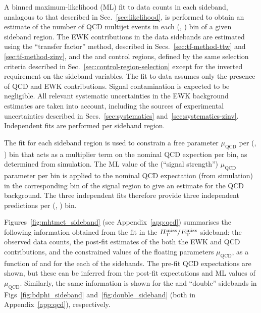 A binned maximum-likelihood (ML) fit to data counts in each sideband,
analagous to that described in Sec.~\ref{sec:likelihood}, is performed
to obtain an estimate of the number of QCD multijet events in each
(\njet, \scalht) bin of a given sideband region. The EWK contributions
in the data sidebands are estimated using the ``transfer factor''
method, described in Secs.~\ref{sec:tf-method-ttw} and
\ref{sec:tf-method-zinv}, and the \mj and \mmj control regions,
defined by the same selection criteria described in
Sec.~\ref{sec:control-region-selection} except for the inverted
requirement on the sideband variables. The fit to data assumes only
the presence of QCD and EWK contributions. Signal contamination is
expected to be negligible. All relevant systematic uncertainties in
the EWK background estimates are taken into account, including the
sources of experimental uncertainties described in
Secs.~\ref{sec:systematics}
and~\ref{sec:systematics-zinv}. Independent fits are performed per
sideband region.

The fit for each sideband region is used to constrain a free parameter
$\mu_{\textrm{QCD}}$ per (\njet, \scalht) bin that acts as a
multiplier term on the nominal QCD expection per bin, as determined
from simulation. The ML value of the (``signal strength'')
$\mu_{\textrm{QCD}}$ parameter per bin is applied to the nominal QCD
expectation (from simulation) in the corresponding bin of the signal
region to give an estimate for the QCD background. The three
independent fits therefore provide three independent predictions per
(\njet, \scalht) bin.

Figures~\ref{fig:mhtmet_sideband} (see Appendix~\ref{app:qcd})
summarises the following information obtained from the fit in the
$\mbox{$\mbox{$H_{\rm T}^{\rm miss}$} / \mbox{$E_\text{T}^{\rm miss}$}$}$ sideband: the observed data counts, the post-fit estimates
of the both the EWK and QCD contributions, and the constrained values
of the floating parameters $\mu_{\textrm{QCD}}$, as a function of
\njet and \scalht for the each of the sidebands. The pre-fit QCD
expectations are shown, but these can be inferred from the post-fit
expectations and ML values of $\mu_{\textrm{QCD}}$. Similarly, the
same information is shown for the \bdphi and ``double'' sidebands in
Figs~\ref{fig:bdphi_sideband} and~\ref{fig:double_sideband} (both in
Appendix~\ref{app:qcd}), respectively.

